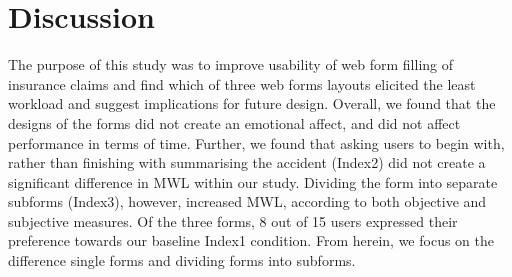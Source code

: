 \documentclass[../main/Replicate.tex]{subfiles}
\begin{document}
\section{Discussion}
	The purpose of this study was to improve usability of web form filling of insurance claims and find which of three web forms layouts elicited the least workload and suggest implications for future design. Overall, we found that the designs of the forms did not create an emotional affect, and did not affect performance in terms of time. Further, we found that asking users to begin with, rather than finishing with summarising the accident (Index2) did not create a significant difference in MWL within our study. Dividing the form into separate subforms (Index3), however, increased MWL, according to both objective and subjective measures. Of the three forms, 8 out of 15 users expressed their preference towards our baseline Index1 condition. From herein, we focus on the difference single forms and dividing forms into subforms. \balance
	
\end{document}
